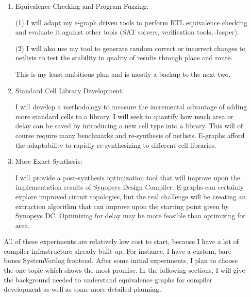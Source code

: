 \documentclass[10pt,letterpaper]{article}
\begin{document}
\begin{enumerate}
    \item Equivalence Checking and Program Fuzzing:

          \hspace{2em}\begin{minipage}{0.8\linewidth}
              (1) I will adapt my e-graph driven tools to perform RTL equivalence checking and evaluate it against other tools (SAT solvers, verification tools, Jasper).

              (2) I will also use my tool to generate random correct or incorrect changes to netlists to test the stability in quality of results through place and route.

              This is my least ambitious plan and is mostly a backup to the next two.
          \end{minipage}

    \item Standard Cell Library Development:

          \hspace{2em}\begin{minipage}{0.8\linewidth}
              I will develop a methodology to measure the incremental advantage of adding more standard cells to a library.
              I will seek to quantify how much area or delay can be saved by introducing a new cell type into a library. This will of course require many benchmarks and re-synthesis of netlists.
              E-graphs afford the adaptability to rapidly re-synthesizing to different cell libraries.
          \end{minipage}

    \item More Exact Synthesis:

          \hspace{2em}\begin{minipage}{0.8\linewidth}
              I will provide a post-synthesis optimization tool that will improve upon the implementation results of Synopsys Design Compiler.
              E-graphs can certainly explore improved circuit topologies, but the real challenge will be creating an extraction algorithm that can improve upon the starting point given by Synopsys DC.
              Optimizing for delay may be more feasible than optimizing for area.
          \end{minipage}
\end{enumerate}

All of these experiments are relatively low cost to start, because I have a lot
of compiler infrastructure already built up. For instance, I have a custom,
bare-bones SystemVerilog frontend. After some initial experiments, I plan to
choose the one topic which shows the most promise. In the following sections, I
will give the background needed to understand equivalence graphs for compiler
development as well as some more detailed planning.
\end{document}
